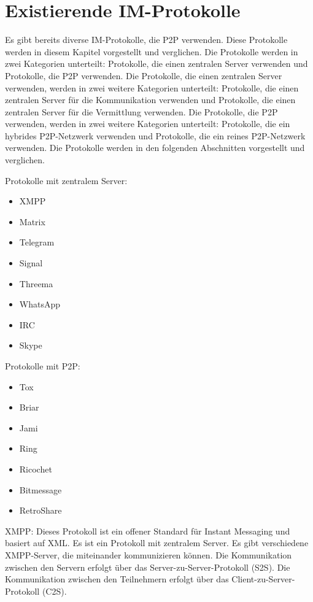\section{Existierende IM-Protokolle}
Es gibt bereits diverse IM-Protokolle, die P2P verwenden. Diese Protokolle werden in diesem Kapitel
vorgestellt und verglichen. Die Protokolle werden in zwei Kategorien unterteilt: Protokolle, die
einen zentralen Server verwenden und Protokolle, die P2P verwenden. Die Protokolle, die einen
zentralen Server verwenden, werden in zwei weitere Kategorien unterteilt: Protokolle, die
einen zentralen Server für die Kommunikation verwenden und Protokolle, die einen zentralen
Server für die Vermittlung verwenden. Die Protokolle, die P2P verwenden, werden in zwei weitere
Kategorien unterteilt: Protokolle, die ein hybrides P2P-Netzwerk verwenden und Protokolle, die
ein reines P2P-Netzwerk verwenden. Die Protokolle werden in den folgenden Abschnitten vorgestellt
und verglichen.

Protokolle mit zentralem Server:

\begin{itemize}
    \item XMPP
    \item Matrix
    \item Telegram
    \item Signal
    \item Threema
    \item WhatsApp
    \item IRC
    \item Skype
\end{itemize}

Protokolle mit P2P:

\begin{itemize}
    \item Tox
    \item Briar
    \item Jami
    \item Ring
    \item Ricochet
    \item Bitmessage
    \item RetroShare
\end{itemize}

XMPP:
Dieses Protokoll ist ein offener Standard für Instant Messaging und basiert auf XML. Es ist ein
Protokoll mit zentralem Server. Es gibt verschiedene XMPP-Server, die miteinander kommunizieren
können. Die Kommunikation zwischen den Servern erfolgt über das Server-zu-Server-Protokoll (S2S).
Die Kommunikation zwischen den Teilnehmern erfolgt über das Client-zu-Server-Protokoll (C2S).

